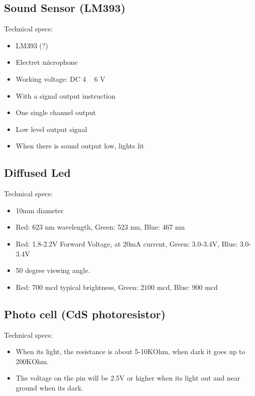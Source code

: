 \documentclass[12pt]{report}
\begin{document}
\begin{appendices}
\subsection{Sound Sensor (LM393)}
Technical specs:
\begin{itemize}
\item LM393 (?)
\item Electret microphone
\item Working voltage: DC 4 ~ 6 V
\item With a signal output instruction
\item One single channel output
\item Low level output signal
\item When there is sound output low, lights lit
\end{itemize}
\subsection{Diffused Led}
Technical specs:
\begin{itemize}
\item 10mm diameter
\item Red: 623 nm wavelength, Green: 523 nm, Blue: 467 nm
\item Red: 1.8-2.2V Forward Voltage, at 20mA current, Green: 3.0-3.4V, Blue: 3.0-3.4V
\item 50 degree viewing angle.
\item Red: 700 mcd typical brightness, Green: 2100 mcd, Blue: 900 mcd
\end{itemize}
\subsection{Photo cell (CdS photoresistor)}
Technical specs:
\begin{itemize}
\item When its light, the resistance is about 5-10KOhm, when dark it goes up to 200KOhm.
\item The voltage on the pin will be 2.5V or higher when its light out and near ground when its dark.
\end{itemize}
\end{appendices}
\end{document}

